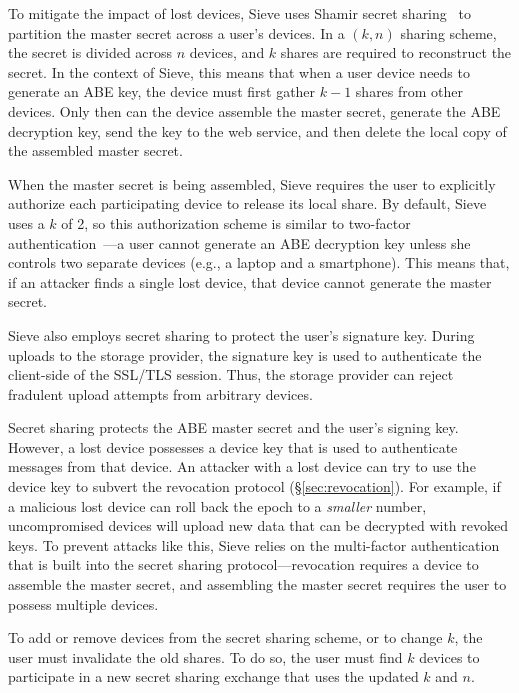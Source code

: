 To mitigate the impact of lost devices, Sieve
uses Shamir secret sharing~\cite{shamir} to
partition the master secret across a user's
devices. In a $(k,n)$ sharing scheme, the
secret is divided across $n$ devices, and
$k$ shares are required to reconstruct the
secret. In the context of Sieve, this means
that when a user device needs to generate
an ABE key, the device must first gather $k-1$
shares from other devices. Only then can the
device assemble the master secret, generate
the ABE decryption key, send the key to the
web service, and then delete the local copy
of the assembled master secret.

When the master secret is being assembled,
Sieve requires the user to explicitly authorize
each participating device to release its local
share. By default, Sieve uses a $k$ of 2, so
this authorization scheme is similar to
two-factor authentication~\cite{twofactor}---a user
cannot generate an ABE decryption key unless
she controls two separate devices (e.g., a
laptop and a smartphone). This means that,
if an attacker finds a single lost device,
that device cannot generate the master secret.

Sieve also employs secret sharing to protect
the user's signature key. During uploads to
the storage provider, the signature key is
used to authenticate the client-side of the
SSL/TLS session. Thus, the storage provider
can reject fradulent upload attempts from
arbitrary devices.

Secret sharing protects the ABE master secret
and the user's signing key. However, a lost
device possesses a device key that is used to
authenticate messages from that device. An
attacker with a lost device can try to use
the device key to subvert the revocation
protocol (\S\ref{sec:revocation}). For example,
if a malicious lost device can roll back the
epoch to a \emph{smaller} number, uncompromised
devices will upload new data that can be
decrypted with revoked keys. To prevent attacks
like this, Sieve relies on the multi-factor
authentication that is built into the secret
sharing protocol---revocation requires a device
to assemble the master secret, and assembling
the master secret requires the user to possess
multiple devices.

To add or remove devices from the secret sharing 
scheme, or to change $k$, the user must invalidate
the old shares. To do so, the user must find $k$
devices to participate in a new secret sharing
exchange that uses the updated $k$ and $n$.

